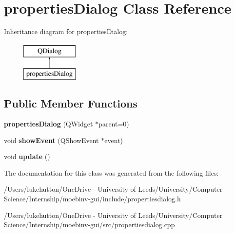 \hypertarget{classproperties_dialog}{}\section{properties\+Dialog Class Reference}
\label{classproperties_dialog}
Inheritance diagram for properties\+Dialog\+:\begin{figure}[H]
\begin{center}
\leavevmode
\includegraphics[height=2.000000cm]{classproperties_dialog}
\end{center}
\end{figure}
\subsection*{Public Member Functions}
\begin{DoxyCompactItemize}
\item 
\mbox{\label{classproperties_dialog_a23e5c7a841b8f1bda7adcc7d99d4da67}} 
{\bfseries properties\+Dialog} (Q\+Widget $\ast$parent=0)
\item 
\mbox{\label{classproperties_dialog_a41e3286b47651d4c757bb12d34660fe6}} 
void {\bfseries show\+Event} (Q\+Show\+Event $\ast$event)
\item 
\mbox{\label{classproperties_dialog_aff17b502153d16b8f19fe75bf1d06d73}} 
void {\bfseries update} ()
\end{DoxyCompactItemize}


The documentation for this class was generated from the following files\+:\begin{DoxyCompactItemize}
\item 
/\+Users/lukehutton/\+One\+Drive -\/ University of Leeds/\+University/\+Computer Science/\+Internship/moebinv-\/gui/include/propertiesdialog.\+h\item 
/\+Users/lukehutton/\+One\+Drive -\/ University of Leeds/\+University/\+Computer Science/\+Internship/moebinv-\/gui/src/propertiesdialog.\+cpp\end{DoxyCompactItemize}
